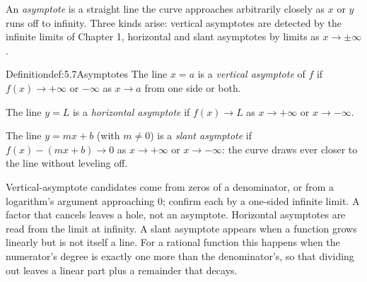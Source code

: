 \documentclass[a4paper,12pt,oneside]{memoir}
\begin{document}
An \emph{asymptote} is a straight line the curve approaches arbitrarily closely as \(x\) or \(y\) runs off to infinity. Three kinds arise: vertical asymptotes are detected by the infinite limits of Chapter 1, horizontal and slant asymptotes by limits as \(x \to \pm\infty\).

\begin{envdefinition}{Definition}{def:5.7}{Asymptotes}
The line \(x = a\) is a \emph{vertical asymptote} of \(f\) if \(f(x) \to +\infty\) or \(-\infty\) as \(x \to a\) from one side or both.

The line \(y = L\) is a \emph{horizontal asymptote} if \(f(x) \to L\) as \(x \to +\infty\) or \(x \to -\infty\).

The line \(y = mx + b\) (with \(m \ne 0\)) is a \emph{slant asymptote} if \(f(x) - (mx + b) \to 0\) as \(x \to +\infty\) or \(x \to -\infty\): the curve draws ever closer to the line without leveling off.
\end{envdefinition}
Vertical-asymptote candidates come from zeros of a denominator, or from a logarithm’s argument approaching \(0\); confirm each by a one-sided infinite limit. A factor that cancels leaves a hole, not an asymptote. Horizontal asymptotes are read from the limit at infinity. A slant asymptote appears when a function grows linearly but is not itself a line. For a rational function this happens when the numerator’s degree is exactly one more than the denominator’s, so that dividing out leaves a linear part plus a remainder that decays.
\end{document}
